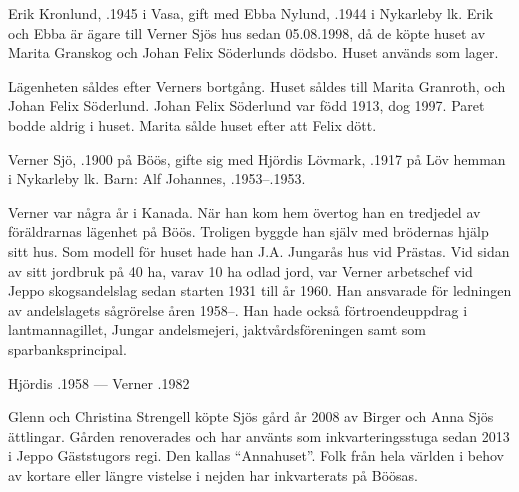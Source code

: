 %



%
Erik Kronlund, .1945 i Vasa, gift med Ebba Nylund, .1944 i Nykarleby lk. Erik och Ebba är ägare till Verner Sjös hus sedan 05.08.1998, då de köpte huset av Marita Granskog och Johan Felix Söderlunds dödsbo. Huset används som lager.\jhvspace{}


%
Lägenheten såldes efter Verners bortgång. Huset såldes till Marita Granroth,  och Johan Felix Söderlund. Johan Felix Söderlund var född 1913, dog 1997. Paret bodde aldrig i huset. Marita sålde huset efter att Felix dött.\jhvspace{}


%
Verner Sjö,  .1900 på Böös, gifte sig med Hjördis Lövmark, .1917 på Löv hemman i Nykarleby lk. Barn: Alf Johannes, .1953--.1953.

Verner var några år i Kanada. När han kom hem övertog han en tredjedel av föräldrarnas lägenhet på Böös. Troligen byggde han själv med brödernas hjälp sitt hus. Som modell för huset hade han J.A. Jungarås hus vid Prästas. Vid sidan av sitt jordbruk på 40 ha, varav 10 ha odlad jord, var Verner arbetschef vid Jeppo skogsandelslag sedan starten 1931 till år 1960. Han ansvarade för ledningen av andelslagets sågrörelse åren 1958--. Han hade också förtroendeuppdrag i lantmannagillet, Jungar andelsmejeri, jaktvårdsföreningen samt som sparbanksprincipal.

Hjördis .1958  ---  Verner .1982



%



%
Glenn och Christina Strengell köpte Sjös gård år 2008 av Birger och Anna Sjös ättlingar. Gården renoverades och har använts som inkvarteringsstuga sedan 2013 i Jeppo Gäststugors regi. Den kallas ``Annahuset''. Folk från hela världen i behov av kortare eller längre vistelse i nejden har inkvarterats på Böösas.

